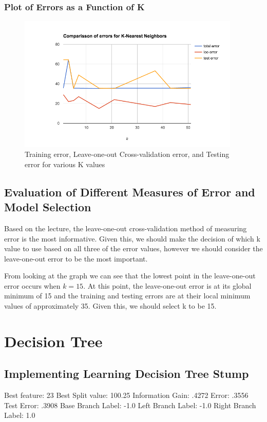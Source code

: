\documentclass[letterpaper,10pt]{article}
\begin{document}
\subsubsection{Plot of Errors as a Function of K}
     \begin{figure}[ht]
    \centering
   \includegraphics[width=300pt]{knn_graph.png}
    \caption{Training error, Leave-one-out Cross-validation error, and Testing error for various K values}
    \label{fig:knnError}
    \end{figure}	


\subsection{Evaluation of Different Measures of Error and Model Selection}
Based on the lecture, the leave-one-out cross-validation method of measuring error is the most informative. Given this, we should make the decision of which k value to use based on all three of the error values, however we should consider the leave-one-out error to be the most important.

From looking at the graph we can see that the lowest point in the leave-one-out error occurs when \(k = 15\). At this point, the leave-one-out error is at its global minimum of 15 and the training and testing errors are at their local minimum values of approximately 35. Given this, we should select k to be 15.

\section{Decision Tree}
\subsection{Implementing Learning Decision Tree Stump}
Best feature: 23
Best Split value: 100.25
Information Gain: .4272
Error: .3556
Test Error: .3908 
Base Branch Label: -1.0
Left Branch Label: -1.0
Right Branch Label: 1.0
\end{document}

